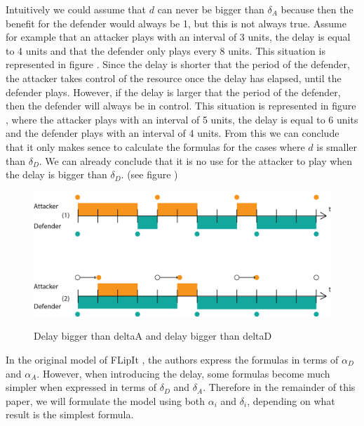 Intuitively we could assume that $d$ can never be bigger than $\delta_{A}$ because then the benefit for the defender would always be 1, but this is not always true. Assume for example that an attacker plays with an interval of 3 units, the delay is equal to 4 units and that the defender only plays every 8 units. This situation is represented in figure . Since the delay is shorter that the period of the defender, the attacker takes control of the resource once the delay has elapsed, until the defender plays. However, if the delay is larger that the period of the defender, then the defender will always be in control. This situation is represented in figure , where the attacker plays with an interval of 5 units, the delay is equal to 6 units and the defender plays with an interval of 4 units. From this we can conclude that it only makes sence to calculate the formulas for the cases where $d$ is smaller than $\delta_{D}$. We can already conclude that it is no use for the attacker to play when the delay is bigger than $\delta_{D}$. (see figure )\\ 

\begin{figure}[hbtp]
\caption{Delay bigger than deltaA and delay bigger than deltaD}
\centering
\includegraphics[scale=0.7]{Images/DiffDelayCase1.png}
\label{delaye}
\end{figure}


In the original model of FLipIt \cite{FlipIt}, the authors express the formulas in terms of $\alpha_{D}$ and $\alpha_{A}$. However, when introducing the delay, some formulas become much simpler when expressed in terms of $\delta_{D}$ and $\delta_{A}$. Therefore in the remainder of this paper, we will formulate the model using both $\alpha_{i}$ and $\delta_{i}$, depending on what result is the simplest formula.

